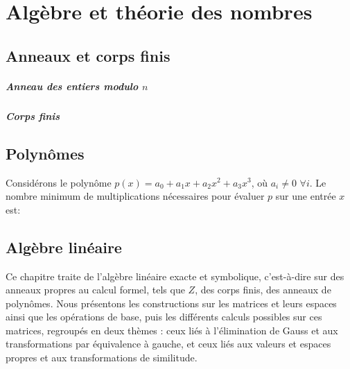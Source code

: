 \part{Algèbre et théorie des nombres}
\chapter{Anneaux et corps finis}
\subsubsection{ Anneau des entiers modulo $n$}
\subsubsection{ Corps finis}
\chapter{Polynômes}
\begin{exercise}
Considérons le polynôme $p(x) = a_{0} + a_{1} x + a_{2} x^{2} + a_{3} x^{3}$, où $a_{i} \neq 0$ $\forall i$. Le nombre minimum de multiplications nécessaires pour évaluer $p$ sur une entrée $x$ est:
\end{exercise}
\chapter{Algèbre linéaire}
Ce chapitre traite de l’algèbre linéaire exacte et symbolique, c’est-à-dire sur
des anneaux propres au calcul formel, tels que $Z$, des corps finis, des anneaux de
polynômes. Nous présentons les constructions sur les matrices et leurs espaces ainsi que les
opérations de base, puis les différents calculs possibles sur ces matrices, regroupés en deux thèmes : ceux liés à l’élimination de Gauss et aux transformations par équivalence à gauche, et ceux liés aux valeurs et espaces
propres et aux transformations de similitude.
